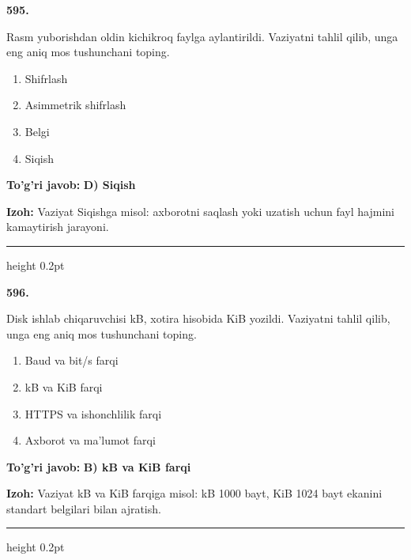 \documentclass[10pt,a4paper,oneside]{article}
\begin{document}
\noindent\textbf{\color{ink}595.}
\par
Rasm yuborishdan oldin kichikroq faylga aylantirildi. Vaziyatni tahlil qilib, unga eng aniq mos tushunchani toping.
\begin{enumerate}[label=\Alph*),leftmargin=9mm]
\item Shifrlash
\item Asimmetrik shifrlash
\item Belgi
\item Siqish
\end{enumerate}
\begin{tcolorbox}[enhanced,breakable,colback=teal!4,colframe=teal!50!black,boxrule=0.5pt,arc=1.1mm,left=3mm,right=3mm,top=1.7mm,bottom=1.7mm,before skip=2mm,after skip=2mm]
\textbf{\color{teal}To'g'ri javob:} \textbf{D) Siqish}
\par\smallskip
\textbf{Izoh:} Vaziyat Siqishga misol: axborotni saqlash yoki uzatish uchun fayl hajmini kamaytirish jarayoni.
\end{tcolorbox}
\vspace{2mm}\hrule height 0.2pt \vspace{3mm}

\noindent\textbf{\color{ink}596.}
\par
Disk ishlab chiqaruvchisi kB, xotira hisobida KiB yozildi. Vaziyatni tahlil qilib, unga eng aniq mos tushunchani toping.
\begin{enumerate}[label=\Alph*),leftmargin=9mm]
\item Baud va bit/s farqi
\item kB va KiB farqi
\item HTTPS va ishonchlilik farqi
\item Axborot va ma'lumot farqi
\end{enumerate}
\begin{tcolorbox}[enhanced,breakable,colback=teal!4,colframe=teal!50!black,boxrule=0.5pt,arc=1.1mm,left=3mm,right=3mm,top=1.7mm,bottom=1.7mm,before skip=2mm,after skip=2mm]
\textbf{\color{teal}To'g'ri javob:} \textbf{B) kB va KiB farqi}
\par\smallskip
\textbf{Izoh:} Vaziyat kB va KiB farqiga misol: kB 1000 bayt, KiB 1024 bayt ekanini standart belgilari bilan ajratish.
\end{tcolorbox}
\vspace{2mm}\hrule height 0.2pt \vspace{3mm}
\end{document}
